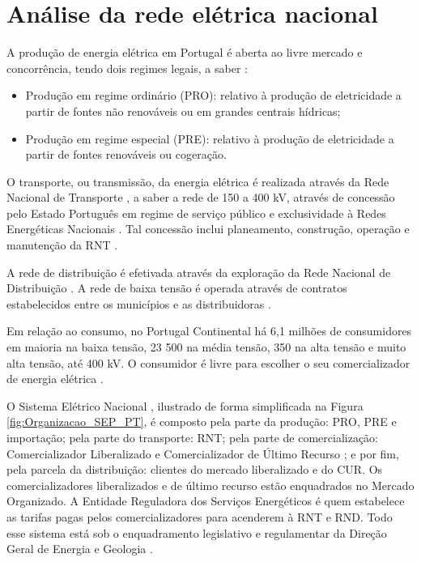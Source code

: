 \section{Análise da rede elétrica nacional}

A produção de energia elétrica em Portugal é aberta ao livre mercado e concorrência, tendo dois regimes legais, a saber \cite{REN-site}:
\begin{itemize}
\item Produção em regime ordinário (PRO): relativo à produção de eletricidade a partir de fontes não renováveis ou em grandes centrais hídricas;
\item Produção em regime especial (PRE): relativo à produção de eletricidade a partir de fontes renováveis ou cogeração.
\end{itemize}

O transporte, ou transmissão, da energia elétrica é realizada através da Rede Nacional de Transporte
, a saber a rede de 150 a 400 kV, através de concessão pelo Estado Português em regime de serviço público e exclusividade à Redes Energéticas Nacionais %
. Tal concessão inclui planeamento, construção, operação e manutenção da RNT \cite{REN-site}.

A rede de distribuição é efetivada através da exploração da Rede Nacional de Distribuição %
. A rede de baixa tensão é operada através de contratos estabelecidos entre os municípios e as distribuidoras \cite{REN-site}.

Em relação ao consumo, no Portugal Continental há 6,1 milhões de consumidores em maioria na baixa tensão, 23 500 na média tensão, 350 na alta tensão e muito alta tensão, até 400 kV. O consumidor é livre para escolher o seu comercializador de energia elétrica \cite{REN-site}.

O Sistema Elétrico Nacional %
, ilustrado de forma simplificada na Figura \ref{fig:Organizacao_SEP_PT}, é composto pela parte da produção: PRO, PRE e importação; pela parte do transporte: RNT; pela parte de comercialização: Comercializador Liberalizado e Comercializador de Último Recurso %
; e por fim, pela parcela da distribuição: clientes do mercado liberalizado e do CUR. Os comercializadores liberalizados e de último recurso estão enquadrados no Mercado Organizado. A Entidade Reguladora dos Serviços Energéticos %
é quem estabelece as tarifas pagas pelos comercializadores para acenderem à RNT e RND. Todo esse sistema está sob o enquadramento legislativo e regulamentar da Direção Geral de Energia e Geologia %
\cite{gil2010analise}.

